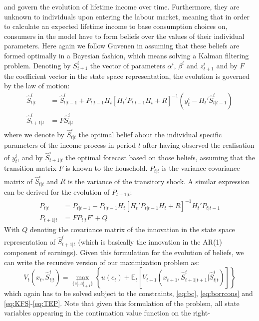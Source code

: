 and govern the evolution of lifetime income over time. Furthermore, they are 
unknown to individuals upon entering the labour market, meaning that in order to
 calculate an expected lifetime income to base consumption choices on, consumers 
in the model have to form beliefs over the values of their individual parameters. 
Here again we follow Guvenen in assuming that these beliefs are formed optimally
in a Bayesian fashion, which means solving a Kalman filtering problem. 
Denoting by $S^i_{t+1}$ the vector of parameters $\alpha^i$, $\beta^i$ and 
$z^i_{t+1}$ and by $F$ the coefficient vector in the state space representation,
the evolution is governed by the law of motion:
\begin{align}
\hat{S}^i_{t|t} &= \hat{S}^i_{t|t-1} + P_{t|t-1} H_t [H_t' P_{t|t-1} H_t + R]^{-1}(y_t^i - H_t' \hat{S}^i_{t|t-1}) \label{eq:KFS} \\
\hat{S}^i_{t+1|t} &= F \hat{S}^i_{t|t} \label{eq:TES}
\end{align}
where we denote by $\hat{S}^i_{t|t}$ the optimal belief about the individual specific
parameters of the income process in period $t$ after having observed the realisation
of $y_t^i$, and by $\hat{S}^i_{t+1|t}$ the optimal forecast based on those beliefs,
assuming that the transition matrix $F$ is known to the household. $P_{t|t}$ is 
the variance-covariance matrix of $\hat{S}^i_{t|t}$ and $R$  is the variance of 
the transitory shock. A similar expression can be derived for the evolution of 
$P_{t+1|t}$:
\begin{align}
P_{t|t} &= P_{t|t-1} - P_{t|t-1} H_t [ H_t' P_{t|t-1} H_t + R]^{-1} H_t' P_{t|t-1} \label{eq:KFP} \\
P_{t+1|t} &= F P_{t|t} F' + Q \label{eq:TEP}
\end{align}
With $Q$ denoting the covariance matrix of the innovation in the state space 
representation of $\hat{S}_{t+1|t}^i$ (which is basically the innovation in the 
AR(1) component of earnings). 
Given this formulation for the evolution of beliefs, we can write the recursive 
version of our maximization problem as:
\begin{equation} \label{eq:bellman}
V_t(x_t,\hat{S}^i_{t|t}) = \max_{\{c_t^i, a_{t+1}^i\}} \left\{ u(c_t) + \mathbb{E}_t \left[ V_{t+1}(x_{t+1},\hat{S}^i_{t+1|t+1}|\hat{S}^i_{t|t}) \right] \right\}
\end{equation}
which again has to be solved subject to the constraints, \ref{eq:bc}, \ref{eq:borrcons} 
and \ref{eq:KFS}-\ref{eq:TEP}. Note that given this formulation of the problem, 
all state variables appearing in the continuation value function on the right-
